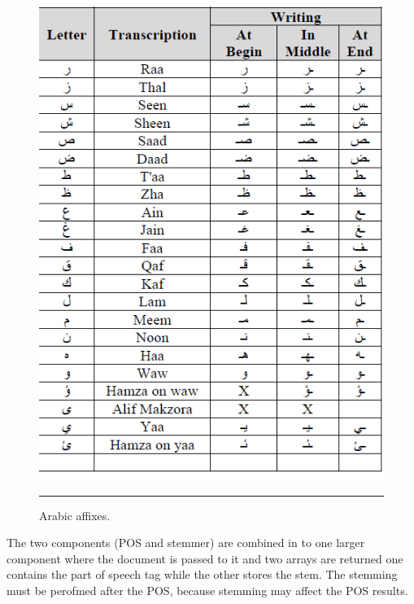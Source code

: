 \begin{figure}[htbp]
	\centering
		\includegraphics{./Figures/pre_4.png}
		\rule{35em}{0.5pt}
	\caption[Arabic affixes.]{Arabic affixes.}
	\label{fig:pre_4}
\end{figure}

The two components (POS and stemmer) are combined in to one larger component where the document is passed to it and two arrays are returned one contains the part of speech tag while the other stores the stem. The stemming must be perofmed after the POS, because stemming may affect the POS results.

